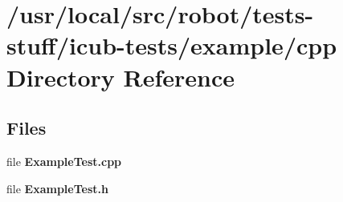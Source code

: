\section{/usr/local/src/robot/tests-\/stuff/icub-\/tests/example/cpp Directory Reference}
\label{dir_b47ca12c4d837d43adfb2f92150f42b2}
\subsection*{Files}
\begin{DoxyCompactItemize}
\item 
file {\bfseries Example\-Test.\-cpp}
\item 
file {\bfseries Example\-Test.\-h}
\end{DoxyCompactItemize}
